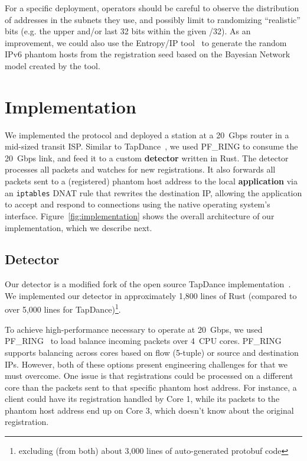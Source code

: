 \documentclass[sigconf,anonymous]{acmart}
\begin{document}
For a specific deployment, operators should be careful to observe the distribution of
addresses in the subnets they use, and possibly limit to randomizing ``realistic''
bits (e.g. the upper and/or last 32 bits within the given /32).
As an improvement, we could also use the Entropy/IP
tool~\cite{foremski2016entropy} to generate the random IPv6 phantom hosts from
the registration seed based on the Bayesian Network model created by the tool.





\section{Implementation}
\label{sec:implementation}

We implemented the \scheme protocol and deployed a station at a
20~Gbps router in a mid-sized transit ISP. Similar to TapDance~\cite{tapdance14}, we used PF\_RING to
consume the 20~Gbps link, and feed it to a custom \textbf{detector} written in Rust. The
detector processes all packets and watches for new registrations. It also
forwards all packets sent to a (registered) phantom host address to the local
\textbf{application} via an \texttt{iptables} DNAT rule that rewrites the destination IP,
allowing the application to accept and respond to connections using the native
operating system's interface. Figure~\ref{fig:implementation} shows the overall
architecture of our implementation, which we describe next.

\FigImplementation

\subsection{Detector}

Our detector is a modified fork of the open source TapDance
implementation~\cite{tapdance-source}.
We implemented our detector in approximately 1,800 lines of Rust (compared to
over 5,000 lines for TapDance)\footnote{excluding (from both) about 3,000 lines
of auto-generated protobuf code}.

To achieve high-performance necessary to operate at 20~Gbps, we used
PF\_RING~\cite{pfring} to load balance incoming packets over 4~CPU cores. PF\_RING
supports balancing across cores based on flow (5-tuple) or source and
destination IPs. However, both of these options present engineering challenges
for \scheme that we must overcome.
One issue is that registrations could be processed on a
different core than the packets sent to that specific phantom host address. For
instance, a client could have its registration handled by Core 1, while its
packets to the phantom host address end up on Core 3, which doesn't know about the
original registration.
\end{document}
